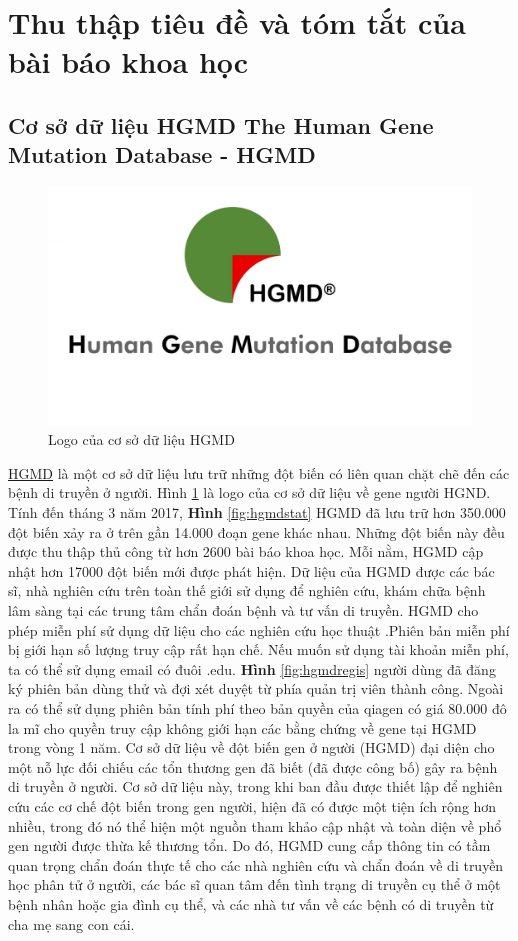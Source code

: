 \documentclass[../DoAn.tex]{subfiles}
\begin{document}
\section{Thu thập tiêu đề và tóm tắt của bài báo khoa học}
\subsection{Cơ sở dữ liệu HGMD The Human Gene Mutation Database - HGMD \cite{HGMD}}

\begin{figure}
\centering
\includegraphics[width=0.7\linewidth]{Hinh_ve/HGMD.png}
\caption{Logo của cơ sở dữ liệu HGMD}
\label{fig:hgmdlogo}
\end{figure}


\href{https://www.ncbi.nlm.nih.gov/pmc/articles/PMC5429360/}{HGMD} là một cơ sở dữ liệu lưu trữ những đột biến có liên quan chặt chẽ đến các bệnh di truyền ở người. Hình \ref{fig:hgmdlogo} là logo của cơ sở dữ liệu về gene người HGND. Tính đến tháng 3 năm 2017, \textbf{Hình} \ref{fig:hgmdstat} HGMD đã lưu trữ hơn 350.000 đột biến xảy ra ở trên gần 14.000 đoạn gene khác nhau. Những đột biến này đều được thu thập thủ công từ hơn 2600 bài báo khoa học. Mỗi nằm, HGMD cập nhật hơn 17000 đột biến mới được phát hiện. Dữ liệu của HGMD được các bác sĩ, nhà nghiên cứu trên toàn thế giới sử dụng để nghiên cứu, khám chữa bệnh lâm sàng tại các trung tâm chẩn đoán bệnh và tư vấn di truyền. HGMD cho phép miễn phí sử dụng dữ liệu cho các nghiên cứu học thuật .Phiên bản miễn phí bị giới hạn số lượng truy cập rất hạn chế. Nếu muốn sử dụng tài khoản miễn phí, ta có thể sử dụng email có đuôi .edu. \textbf{Hình} \ref{fig:hgmdregis} người dùng đã đăng ký phiên bản dùng thử và đợi xét duyệt từ phía quản trị viên thành công. Ngoài ra có thể sử dụng phiên bản tính phí theo bản quyền của qiagen có giá 80.000 đô la mĩ cho quyền truy cập không giới hạn các bằng chứng về gene tại HGMD trong vòng 1 năm. Cơ sở dữ liệu về đột biến gen ở người (HGMD) đại diện cho một nỗ lực đối chiếu các tổn thương gen đã biết (đã được công bố) gây ra bệnh di truyền ở người. Cơ sở dữ liệu này, trong khi ban đầu được thiết lập để nghiên cứu các cơ chế đột biến trong gen người, hiện đã có được một tiện ích rộng hơn nhiều, trong đó nó thể hiện một nguồn tham khảo cập nhật và toàn diện về phổ gen người được thừa kế thương tổn. Do đó, HGMD cung cấp thông tin có tầm quan trọng chẩn đoán thực tế cho các nhà nghiên cứu và chẩn đoán về di truyền học phân tử ở người, các bác sĩ quan tâm đến tình trạng di truyền cụ thể ở một bệnh nhân hoặc gia đình cụ thể, và các nhà tư vấn về các bệnh có di truyền từ cha mẹ sang con cái.
\end{document}
